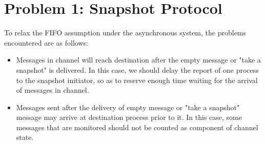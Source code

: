 \documentclass[11pt,a4paper]{article}
\begin{document}
\begin{titlepage}
    \maketitle
\end{titlepage}
\renewcommand{\contentsname}{Contents}
\begin{center} 
    \tableofcontents 
\end{center}
\newpage

\section{Problem 1: Snapshot Protocol}
To relax the FIFO assumption under the asynchronous system, the problems
encountered are as follows: 
\begin{itemize}
    \item{Messages in channel will reach destination after the empty message
            or "take a snapshot" is delivered. In this case, we should delay the
            report of one process to the snapshot initiator, so as to reserve
        enough time waiting for the arrival of messages in channel. }
    \item{Messages sent after the delivery of empty message or "take a
            snapshot" message may arrive at destination process prior to it.
            In this case, some messages that are monitored should not be
            counted as component of channel state.} 
\end{itemize}
\end{document}
